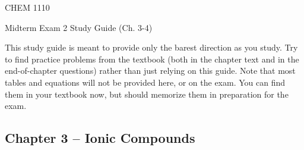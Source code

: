 \documentclass[12pt, letterpaper]{memoir}
\begin{document}
	\mainmatter
	
	\begin{center}
		{\Huge CHEM 1110}
		
		{\LARGE Midterm Exam 2 Study Guide (Ch. 3-4)}
	\end{center}
	
		This study guide is meant to provide only the barest direction as you study. Try to find practice problems from the textbook (both in the chapter text and in the end-of-chapter questions) rather than just relying on this guide. Note that most tables and equations will not be provided here, or on the exam. You can find them in your textbook now, but should memorize them in preparation for the exam.

	\subsection*{Chapter 3 -- Ionic Compounds}
\end{document}
